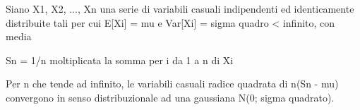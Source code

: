 \documentclass{article}
\begin{document}

Siano X1, X2, ..., Xn una serie di variabili casuali indipendenti
ed identicamente distribuite tali per cui E[Xi] = mu e
Var[Xi] = sigma quadro < infinito, con media

Sn = 1/n moltiplicata la somma per i da 1 a n di Xi

Per n che tende ad infinito, le variabili casuali
radice quadrata di n(Sn - mu) convergono in senso distribuzionale
ad una gaussiana N(0; sigma quadrato).
\end{document}
